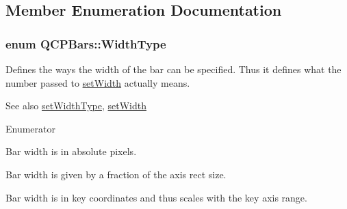 \subsection{Member Enumeration Documentation}
\subsubsection[{\texorpdfstring{Width\+Type}{WidthType}}]{\setlength{\rightskip}{0pt plus 5cm}enum {\bf Q\+C\+P\+Bars\+::\+Width\+Type}}\hypertarget{classQCPBars_a65dbbf1ab41cbe993d71521096ed4649}{}\label{classQCPBars_a65dbbf1ab41cbe993d71521096ed4649}
Defines the ways the width of the bar can be specified. Thus it defines what the number passed to \hyperlink{classQCPBars_afec6116579d44d5b706e0fa5e5332507}{set\+Width} actually means.

\begin{DoxySeeAlso}{See also}
\hyperlink{classQCPBars_adcaa3b41281bb2c0f7949b341592fcc0}{set\+Width\+Type}, \hyperlink{classQCPBars_afec6116579d44d5b706e0fa5e5332507}{set\+Width} 
\end{DoxySeeAlso}
\begin{Desc}
\item[Enumerator]\par
\begin{description}
\item[{\em 
wt\+Absolute\hypertarget{classQCPBars_a65dbbf1ab41cbe993d71521096ed4649ab74315c9aa77df593c58dd25dfc0de35}{}\label{classQCPBars_a65dbbf1ab41cbe993d71521096ed4649ab74315c9aa77df593c58dd25dfc0de35}
}]Bar width is in absolute pixels. \item[{\em 
wt\+Axis\+Rect\+Ratio\hypertarget{classQCPBars_a65dbbf1ab41cbe993d71521096ed4649a90bc09899361ad3422ff277f7c790ffe}{}\label{classQCPBars_a65dbbf1ab41cbe993d71521096ed4649a90bc09899361ad3422ff277f7c790ffe}
}]Bar width is given by a fraction of the axis rect size. \item[{\em 
wt\+Plot\+Coords\hypertarget{classQCPBars_a65dbbf1ab41cbe993d71521096ed4649aad3cc60ae1bfb1160a30237bee9eaf10}{}\label{classQCPBars_a65dbbf1ab41cbe993d71521096ed4649aad3cc60ae1bfb1160a30237bee9eaf10}
}]Bar width is in key coordinates and thus scales with the key axis range. \end{description}
\end{Desc}


